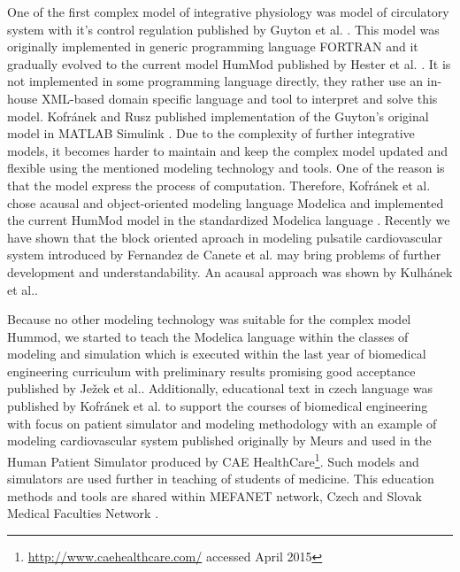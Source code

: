 \documentclass[letterpaper, 10 pt, conference]{ieeeconf}  %
\begin{document}
One of the first complex model of integrative physiology was model of circulatory system with it's control regulation published by Guyton et al. \cite{Guyton1972}. This model was originally implemented in generic programming language FORTRAN and it gradually evolved to the current model HumMod published by Hester et al. \cite{Hester2011systems,hester2011}. It is not implemented in some programming language directly, they rather use an in-house XML-based domain specific language and tool to interpret and solve this model. Kofránek and Rusz published implementation of the Guyton's original model in MATLAB Simulink \cite{Kofranek2010}. Due to the complexity of further integrative models, it becomes harder to maintain and keep the complex model updated and flexible using the mentioned modeling technology and tools. One of the reason is that the model express the process of computation.  
Therefore, Kofránek et al. chose acausal and object-oriented modeling language Modelica and implemented the current HumMod model in the standardized Modelica language \cite{Kofranek2011hummod}. Recently we have shown that the block oriented aproach in modeling pulsatile cardiovascular system introduced by Fernandez de Canete et al.\cite{FernandezdeCanete2014} may bring problems of further development and understandability. An acausal approach was shown by Kulhánek et al.\cite{Kulhanek2014Modeling}.


Because no other modeling technology was suitable for the complex model Hummod, we started to teach the Modelica language within the classes of modeling and simulation which is executed within the last year of biomedical engineering curriculum with preliminary results promising good acceptance published by Ježek et al.\cite{Jezek2012}.
Additionally, educational text in czech language was published by Kofránek et al.\cite{kofranek2013Pacientske} to support the courses of biomedical engineering with focus on patient simulator and modeling methodology with an example of modeling cardiovascular system published originally by Meurs \cite{Meurs2011} and used in the \textregistered Human Patient Simulator produced by CAE HealthCare\footnote{\url{http://www.caehealthcare.com/} accessed April 2015}. Such models and simulators are used further in teaching of students of medicine. This  education methods and tools are shared within MEFANET network, Czech and Slovak Medical Faculties Network \cite{Schwarz2014}.
\end{document}
